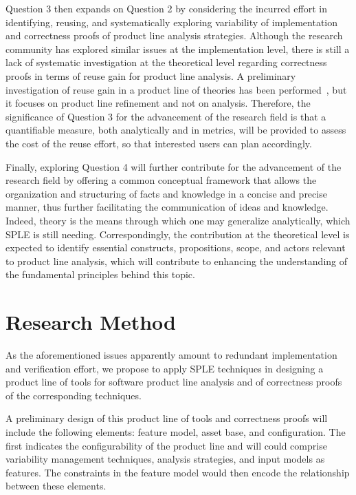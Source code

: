 Question 3 then expands on Question 2 by considering the incurred effort in identifying, reusing, and systematically exploring variability of  implementation and correctness proofs of product line analysis strategies. Although the research community has explored similar issues at the implementation level, there is still a lack of systematic investigation at the theoretical level regarding correctness proofs in terms of reuse gain for product line analysis. A preliminary investigation of reuse gain in a product line of theories has been performed~\cite{Teixeira2015}, but it focuses on product line refinement and not on analysis. Therefore, the significance of Question 3 for the advancement of the research field is that a quantifiable measure, both analytically and in metrics, will be provided to assess the cost of the reuse effort, so that interested users can plan accordingly.

Finally, exploring Question 4 will further contribute for the advancement of the research field by offering a common conceptual framework that allows the organization and structuring of facts and knowledge in a concise and precise manner, thus further facilitating the communication of ideas and knowledge. Indeed, theory is the means through which one may generalize analytically, which SPLE is still needing. Correspondingly, the contribution at the theoretical level is expected to identify essential constructs, propositions, scope, and actors relevant to product line analysis, which will contribute to enhancing the understanding of the fundamental principles behind this topic.




\section{Research Method}
\label{sec:methodology}

As the aforementioned issues apparently amount to redundant implementation and verification effort, we propose to apply SPLE techniques in designing a product line of tools for software product line analysis and of correctness proofs of the corresponding techniques.

A preliminary design of this product line of tools and correctness proofs will include the following elements: feature model, asset base, and configuration. 
The first indicates the configurability of the product line and will could comprise variability management techniques, analysis strategies, and input
models as features. The constraints in the feature model would then encode the
relationship between these elements. 

